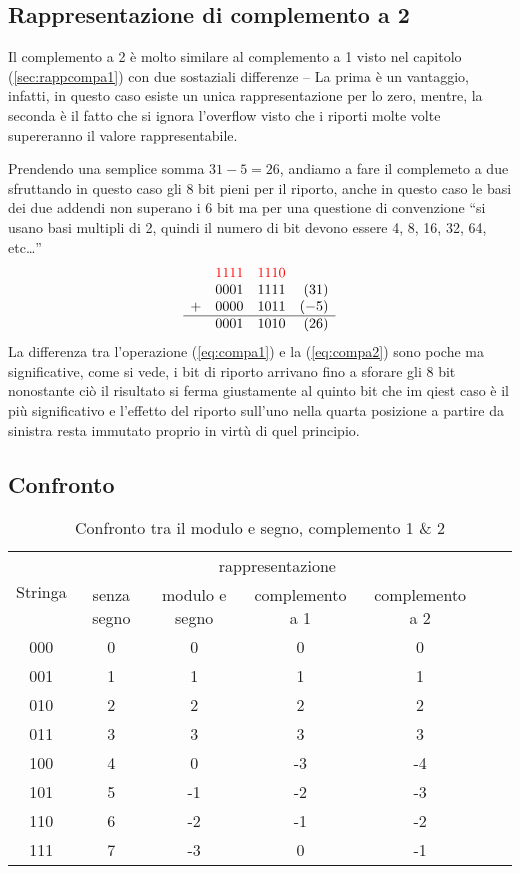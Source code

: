\subsection{Rappresentazione di complemento a 2}
\label{sec:rappcompa2}
Il complemento a 2 è molto similare al complemento a 1 visto nel capitolo
(\ref{sec:rappcompa1}) con due sostaziali differenze -- La prima è un vantaggio,
infatti, in questo caso esiste un unica rappresentazione per lo zero, mentre,
la seconda è il fatto che si ignora l'overflow visto che i riporti molte volte
supereranno il valore rappresentabile.
\begin{esempio}
  Prendendo una semplice somma $31-5=26$, andiamo a fare il complemeto a due sfruttando
  in questo caso gli 8 bit pieni per il riporto, anche in questo caso le basi dei due
  addendi non superano i 6 bit ma per una questione di convenzione ``si usano basi
  multipli di 2, quindi il numero di bit devono essere 4, 8, 16, 32, 64, etc\dots''
  \begin{equation}
    \label{eq:compa2}
    \begin{array}{lccr}
      &{\color{red}1111}&{\color{red}1110}\\
      &0001&1111&(31)\\
      +&0000&1011&(-5)\\\hline
      &0001&1010&(26)
    \end{array}
  \end{equation}
  La differenza tra l'operazione (\ref{eq:compa1}) e la (\ref{eq:compa2}) sono poche
  ma significative, come si vede, i bit di riporto arrivano fino a sforare gli 8 bit
  nonostante ciò il risultato si ferma giustamente al quinto bit che im qiest caso
  è il più significativo e l'effetto del riporto sull'uno nella quarta posizione a
  partire da sinistra resta immutato proprio in virtù di quel principio.
\end{esempio} 
\subsection{Confronto}
\label{sec:controntotracomplementi}

\begin{table}[h!]
	\centering
	\begin{tabular}{|c|c|c|c|c|c|c|}
		\hline
		\multirow{2}{*}{Stringa}&\multicolumn{4}{c|}{rappresentazione}\\
		&senza segno&modulo e segno&complemento a 1&complemento a 2\\\hline
		000&0&0&0&0\\\hline
		001&1&1&1&1\\\hline
		010&2&2&2&2\\\hline
		011&3&3&3&3\\\hline
		100&4&0&-3&-4\\\hline
		101&5&-1&-2&-3\\\hline
		110&6&-2&-1&-2\\\hline
		111&7&-3&0&-1\\\hline
	\end{tabular}
	\caption {Confronto tra il modulo e segno, complemento 1 \& 2}
\end{table}

